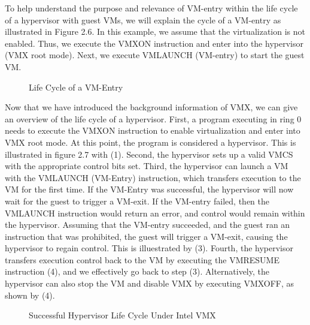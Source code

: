 \documentclass{report}
\begin{document}
\begin{spacing}{1.5}
{\large
To help understand the purpose and relevance of VM-entry within the life cycle of a hypervisor with guest VMs, we will explain the cycle of a VM-entry as illustrated in Figure 2.6. In this example, we assume that the virtualization is not enabled. Thus, we execute the VMXON instruction and enter into the hypervisor (VMX root mode). Next, we execute VMLAUNCH (VM-entry) to start the guest VM. 
\newline
}



\newpage
\vfill

\begin{figure}[ht]
\centering
  \caption{Life Cycle of a VM-Entry}
\end{figure}


{\large
Now that we have introduced the background information of VMX, we can give an overview of the life cycle of a hypervisor. First, a program executing in ring 0 needs to execute the VMXON instruction to enable virtualization and enter into VMX root mode. At this point, the program is considered a hypervisor. This is illustrated in figure 2.7 with (1). Second, the hypervisor sets up a valid VMCS with the appropriate control bits set. Third, the hypervisor can launch a VM with the VMLAUNCH (VM-Entry) instruction, which transfers execution to the VM for the first time. If the VM-Entry was successful, the hypervisor will now wait for the guest to trigger a VM-exit. If the VM-entry failed, then the VMLAUNCH instruction would return an error, and control would remain within the hypervisor. Assuming that the VM-entry succeeded, and the guest ran an instruction that was prohibited, the guest will trigger a VM-exit, causing the hypervisor to regain control. This is illuestrated by (3). Fourth, the hypervisor transfers execution control back to the VM by executing the VMRESUME instruction (4), and we effectively go back to step (3). Alternatively, the hypervisor can also stop the VM and disable VMX by executing VMXOFF, as shown by (4).
\newline


\newpage
\vfill
{}
\begin{figure}[ht]
\centering
  \caption{Successful Hypervisor Life Cycle Under Intel VMX}
\end{figure}
}











\end{spacing}
\end{document}
